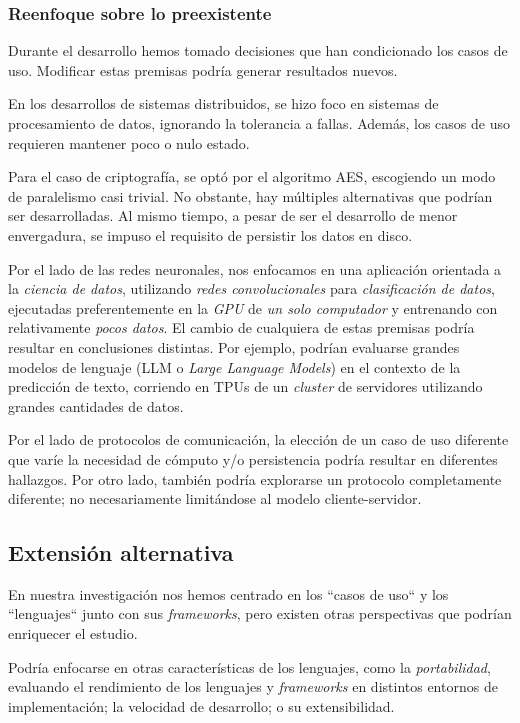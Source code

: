 \documentclass[11pt]{article}
\let\Oldsubsection\subsection
\renewcommand{\subsection}{\FloatBarrier\Oldsubsection}
\let\Oldsubsubsection\subsubsection
\renewcommand{\subsubsection}{\FloatBarrier\Oldsubsubsection}
\newcommand{\english}[1]{\textit{#1}}
\begin{document}
\subsubsection{Reenfoque sobre lo preexistente}

Durante el desarrollo hemos tomado decisiones que han condicionado los casos de uso. Modificar estas premisas podría generar resultados nuevos.

En los desarrollos de sistemas distribuidos, se hizo foco en sistemas de procesamiento de datos, ignorando la tolerancia a fallas. Además, los casos de uso requieren mantener poco o nulo estado.

Para el caso de criptografía, se optó por el algoritmo AES, escogiendo un modo de paralelismo casi trivial. No obstante, hay múltiples alternativas que podrían ser desarrolladas. Al mismo tiempo, a pesar de ser el desarrollo de menor envergadura, se impuso el requisito de persistir los datos en disco.

Por el lado de las redes neuronales, nos enfocamos en una aplicación orientada a la \textit{ciencia de datos}, utilizando \textit{redes convolucionales} para \textit{clasificación de datos}, ejecutadas preferentemente en la \textit{GPU} de \textit{un solo computador} y entrenando con relativamente \textit{pocos datos}. El cambio de cualquiera de estas premisas podría resultar en conclusiones distintas. Por ejemplo, podrían evaluarse grandes modelos de lenguaje (LLM o \english{Large Language Models}) en el contexto de la predicción de texto, corriendo en TPUs de un \english{cluster} de servidores utilizando grandes cantidades de datos.

Por el lado de protocolos de comunicación, la elección de un caso de uso diferente que varíe la necesidad de cómputo y/o persistencia podría resultar en diferentes hallazgos. Por otro lado, también podría explorarse un protocolo completamente diferente; no necesariamente limitándose al modelo cliente-servidor.

\subsection{Extensión alternativa}

En nuestra investigación nos hemos centrado en los ``casos de uso`` y los ``lenguajes`` junto con sus \english{frameworks}, pero existen otras perspectivas que podrían enriquecer el estudio.

Podría enfocarse en otras características de los lenguajes, como la \textit{portabilidad}, evaluando el rendimiento de los lenguajes y \english{frameworks} en distintos entornos de implementación; la velocidad de desarrollo; o su extensibilidad.
\end{document}
